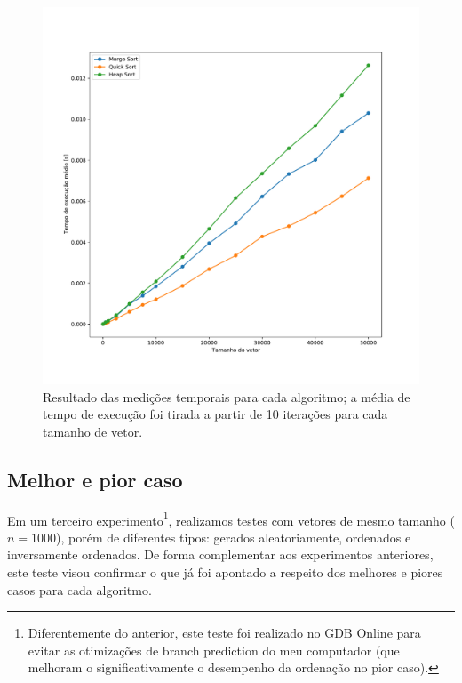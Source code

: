 \documentclass[fontsize=10pt]{article}
\begin{document}
\begin{figure}[ht]
\begin{center}
    \includegraphics[scale=0.5]{comparacao2_2.pdf}
    \caption{Resultado das medições temporais para cada algoritmo; a média de tempo de execução foi tirada a partir de 10 iterações para cada tamanho de vetor.}
    \label{Figura 3}
\end{center}
\end{figure}

\newpage
\subsection{Melhor e pior caso}

\quad Em um terceiro experimento\footnote{Diferentemente do anterior, este teste foi realizado no GDB Online para evitar as otimizações de branch prediction do meu computador (que melhoram o significativamente o desempenho da ordenação no pior caso).}, realizamos testes com vetores de mesmo tamanho ($n = 1000$), porém de diferentes tipos: gerados aleatoriamente, ordenados e inversamente ordenados. De forma complementar aos experimentos anteriores, este teste visou confirmar o que já foi apontado a respeito dos melhores e piores casos para cada algoritmo.
\end{document}
